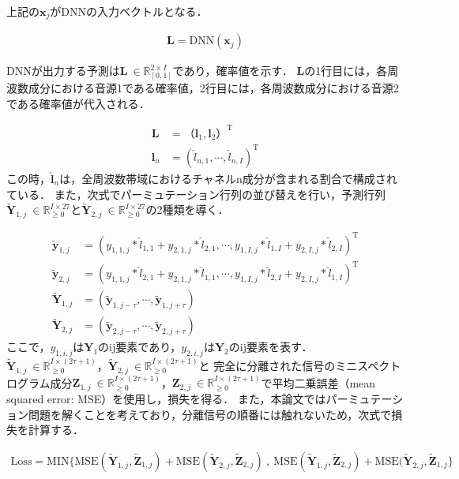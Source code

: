 上記の$\bm{x}_j$がDNNの入力ベクトルとなる．

\begin{align}
    \bm{L} = \mathrm{DNN}(\bm{x}_j)
\end{align}

DNNが出力する予測は$\bm{L} ~\in \mathbb{R}_{[0,1]}^{2 \times I}$であり，確率値を示す．
$\bm{L}$の1行目には，各周波数成分における音源1である確率値，2行目には，各周波数成分における音源2である確率値が代入される．

\begin{align}
    \bm{L} &= （\bm{l}_{1} , \bm{l}_{2}）^\mathrm{T}\\
    \bm{l}_n &= (\widehat{l}_{n,1}, \cdots, \widehat{l}_{n,I})^\mathrm{T}
\end{align}
この時，$\widehat{\bm{l}}_{n}$は，全周波数帯域におけるチャネルn成分が含まれる割合で構成されている．
また，次式でパーミュテーション行列の並び替えを行い，予測行列$\widetilde{\bm{Y}}_{1,j} ~\in \mathbb{R}_{\geq 0}^{I \times 27}$と$\widetilde{\bm{Y}}_{2,j} ~\in \mathbb{R}_{\geq 0}^{I \times 27}$の2種類を導く．

\begin{align}
    \widetilde{\bm{y}}_{1,j} &= ({y}_{1,1,j}*\widehat{l}_{1,1} + y_{2,1,j}*\widehat{l}_{2,1}, \cdots, {y}_{1,I,j}*\widehat{l}_{1,I} + y_{2,I,j}*\widehat{l}_{2,I})^\mathrm{T}\\
    \widetilde{\bm{y}}_{2,j} &= ({y}_{1,1,j}*\widehat{l}_{2,1} + y_{2,1,j}*\widehat{l}_{1,1}, \cdots, {y}_{1,I,j}*\widehat{l}_{2,I} + y_{2,I,j}*\widehat{l}_{1,I})^\mathrm{T}\\
    \widetilde{\bm{Y}}_{1,j} &= (\widetilde{\bm{y}}_{1,j-\tau}, \cdots, \widetilde{\bm{y}}_{1,j+\tau}) \\
    \widetilde{\bm{Y}}_{2,j} &= (\widetilde{\bm{y}}_{2,j-\tau}, \cdots, \widetilde{\bm{y}}_{2,j+\tau}) 
\end{align}
ここで，${y}_{1,i,j}$は$\bm{Y}_1$のij要素であり，${y}_{2,i,j}$は$\bm{Y}_2$のij要素を表す．
$\widetilde{\bm{Y}}_{1,j} ~\in \mathbb{R}_{\geq 0}^{I \times (2\tau+1)}$，$\widetilde{\bm{Y}}_{2,j} ~\in \mathbb{R}_{\geq 0}^{I \times (2\tau+1)}$と
完全に分離された信号のミニスペクトログラム成分$\bm{Z}_{1,j}~\in \mathbb{R}_{\geq 0}^{I \times (2\tau+1)}$，$\bm{Z}_{2,j}~\in \mathbb{R}_{\geq 0}^{I \times (2\tau+1)}$で平均二乗誤差（mean squared error: MSE）を使用し，損失を得る．
また，本論文ではパーミュテーション問題を解くことを考えており，分離信号の順番には触れないため，次式で損失を計算する．

\begin{align}
    \mathrm{Loss} = \mathrm{MIN}\{\mathrm{MSE}(\widetilde{\bm{Y}}_{1,j}, \widetilde{\bm{Z}}_{1,j}) + \mathrm{MSE}(\widetilde{\bm{Y}}_{2,j}, \widetilde{\bm{Z}}_{2,j}) ~ , ~ \mathrm{MSE}(\widetilde{\bm{Y}}_{1,j}, \widetilde{\bm{Z}}_{2,j}) + \mathrm{MSE}(\widetilde{\bm{Y}}_{2,j}, \widetilde{\bm{Z}}_{1,j}\}
\end{align}

